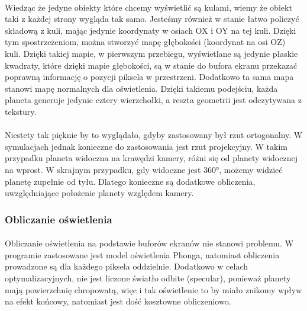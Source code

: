 \paragraph{}

Wiedząc że jedyne obiekty które chcemy wyświetlić są kulami, wiemy że obiekt taki z każdej strony wygląda tak samo. Jesteśmy również w stanie łatwo policzyć składową z kuli, mając jedynie koordynaty w osiach OX i OY na tej kuli. Dzięki tym spostrzeżeniom, można stworzyć mapę głębokości (koordynat na osi OZ) kuli. Dzięki takiej mapie, w pierwszym przebiegu, wyświetlane są jedynie płaskie kwadraty, które dzięki mapie głębokości, są w stanie do bufora ekranu przekazać poprawną informację o pozycji piksela w przestrzeni. Dodatkowo ta sama mapa stanowi mapę normalnych dla oświetlenia. Dzięki takiemu podejściu, każda planeta generuje jedynie cztery wierzchołki, a reszta geometrii jest odczytywana z tekstury.

\paragraph{}

Niestety tak pięknie by to wyglądało, gdyby zastosowany był rzut ortogonalny. W symulacjach jednak konieczne do zastosowania jest rzut projekcyjny. W takim przypadku planeta widoczna na krawędzi kamery, różni się od planety widocznej na wprost. W skrajnym przypadku, gdy widoczne jest 360°, możemy widzieć planetę zupełnie od tyłu. Dlatego konieczne są dodatkowe obliczenia, uwzględniające położenie planety względem kamery.

\subsubsection{Obliczanie oświetlenia}\label{ssub:obliczanie oświetlenia}
\paragraph{}

Obliczanie oświetlenia na podstawie buforów ekranów nie stanowi problemu. W programie zastosowane jest model oświetlenia Phonga, natomiast obliczenia prowadzone są dla każdego piksela oddzielnie. Dodatkowo w celach optymalizacyjnych, nie jest liczone światło odbite (specular), ponieważ planety mają powierzchnię chropowatą, więc i tak oświetlenie to by miało znikomy wpływ na efekt końcowy, natomiast jest dość kosztowne obliczeniowo.

\paragraph{}

